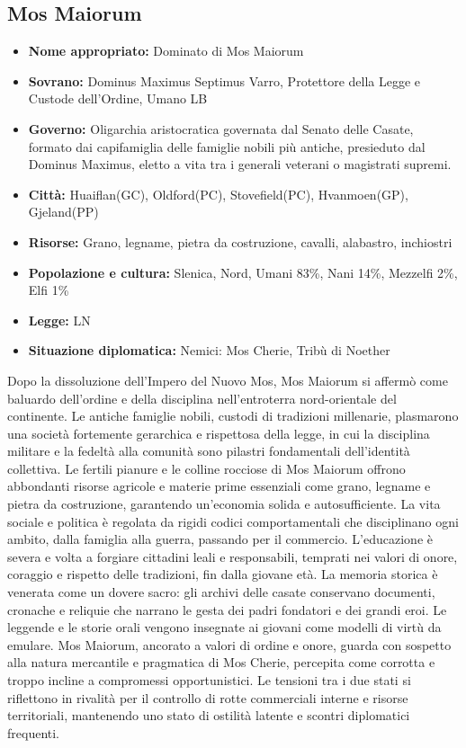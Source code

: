 \documentclass[10pt, a4paper]{report}
\begin{document}
\begin{multicols}{2}
\subsection*{Mos Maiorum}
\begin{itemize}
	\item \textbf{Nome appropriato:} Dominato di Mos Maiorum
	\item \textbf{Sovrano:} Dominus Maximus Septimus Varro, Protettore della Legge e Custode dell'Ordine, Umano LB
	\item \textbf{Governo:} Oligarchia aristocratica governata dal Senato delle Casate, formato dai capifamiglia delle famiglie nobili più antiche, presieduto dal Dominus Maximus, eletto a vita tra i generali veterani o magistrati supremi.
	\item \textbf{Città:} Huaiflan(GC), Oldford(PC), Stovefield(PC), Hvanmoen(GP), Gjeland(PP)
	\item \textbf{Risorse:} Grano, legname, pietra da costruzione, cavalli, alabastro, inchiostri
	\item \textbf{Popolazione e cultura:} Slenica, Nord, Umani 83\%, Nani 14\%, Mezzelfi 2\%, Elfi 1\%
	\item \textbf{Legge:} LN
	\item \textbf{Situazione diplomatica:} Nemici: Mos Cherie, Tribù di Noether
\end{itemize}
Dopo la dissoluzione dell’Impero del Nuovo Mos, Mos Maiorum si affermò come baluardo dell’ordine e della disciplina nell’entroterra nord-orientale del continente. Le antiche famiglie nobili, custodi di tradizioni millenarie, plasmarono una società fortemente gerarchica e rispettosa della legge, in cui la disciplina militare e la fedeltà alla comunità sono pilastri fondamentali dell’identità collettiva.
Le fertili pianure e le colline rocciose di Mos Maiorum offrono abbondanti risorse agricole e materie prime essenziali come grano, legname e pietra da costruzione, garantendo un’economia solida e autosufficiente.
La vita sociale e politica è regolata da rigidi codici comportamentali che disciplinano ogni ambito, dalla famiglia alla guerra, passando per il commercio. L’educazione è severa e volta a forgiare cittadini leali e responsabili, temprati nei valori di onore, coraggio e rispetto delle tradizioni, fin dalla giovane età.
La memoria storica è venerata come un dovere sacro: gli archivi delle casate conservano documenti, cronache e reliquie che narrano le gesta dei padri fondatori e dei grandi eroi. Le leggende e le storie orali vengono insegnate ai giovani come modelli di virtù da emulare.
Mos Maiorum, ancorato a valori di ordine e onore, guarda con sospetto alla natura mercantile e pragmatica di Mos Cherie, percepita come corrotta e troppo incline a compromessi opportunistici. Le tensioni tra i due stati si riflettono in rivalità per il controllo di rotte commerciali interne e risorse territoriali, mantenendo uno stato di ostilità latente e scontri diplomatici frequenti.



\end{multicols}
\end{document}
